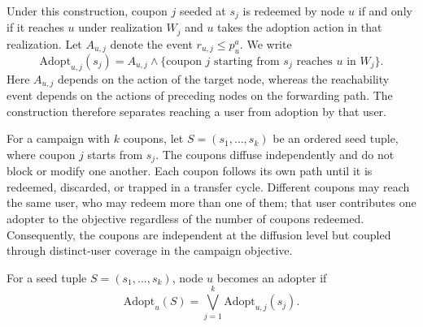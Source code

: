 \documentclass[sigconf,balance=false]{acmart}
\begin{document}
Under this construction, coupon $j$ seeded at $s_j$ is redeemed by node $u$
if and only if it reaches $u$ under realization $W_j$ and $u$ takes the
adoption action in that realization.
Let $A_{u,j}$ denote the event $r_{u,j}\leq p_u^a$.
We write
\[
  \mathrm{Adopt}_{u,j}(s_j)
  = A_{u,j}\wedge
    \{\text{coupon }j\text{ starting from }s_j
      \text{ reaches }u\text{ in }W_j\}.
\]
Here $A_{u,j}$ depends on the action of the target node, whereas the
reachability event depends on the actions of preceding nodes on the
forwarding path.
The construction therefore separates reaching a user from adoption by
that user.

For a campaign with $k$ coupons, let $S=(s_1,\ldots,s_k)$ be an ordered
seed tuple, where coupon $j$ starts from $s_j$.
The coupons diffuse independently and do not block or modify one another.
Each coupon follows its own path until it is redeemed, discarded, or
trapped in a transfer cycle.
Different coupons may reach the same user, who may redeem more than one of
them; that user contributes one adopter to the objective regardless of the
number of coupons redeemed.
Consequently, the coupons are independent at the diffusion level but
coupled through distinct-user coverage in the campaign objective.

For a seed tuple $S=(s_1,\ldots,s_k)$, node $u$ becomes an adopter if
\[
  \mathrm{Adopt}_u(S) = \bigvee_{j=1}^{k} \mathrm{Adopt}_{u,j}(s_j).
\]
\end{document}
